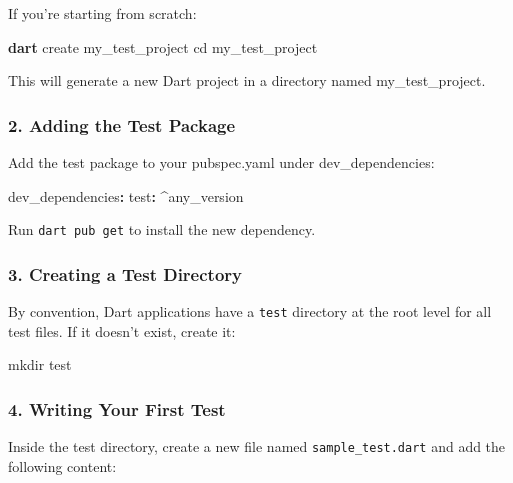\documentclass[
]{article}
\newenvironment{Shaded}{\begin{snugshade}}{\end{snugshade}}
\newcommand{\AttributeTok}[1]{\textcolor[rgb]{0.16,0.50,0.73}{#1}}
\newcommand{\BuiltInTok}[1]{\textcolor[rgb]{0.50,0.55,0.55}{#1}}
\newcommand{\ExtensionTok}[1]{\textcolor[rgb]{0.00,0.60,1.00}{\textbf{#1}}}
\newcommand{\FunctionTok}[1]{\textcolor[rgb]{0.56,0.27,0.68}{#1}}
\newcommand{\KeywordTok}[1]{\textcolor[rgb]{0.81,0.81,0.76}{\textbf{#1}}}
\newcommand{\NormalTok}[1]{\textcolor[rgb]{0.81,0.81,0.76}{#1}}
\begin{document}
If you're starting from scratch:

\begin{Shaded}
\begin{Highlighting}[]
\ExtensionTok{dart}\NormalTok{ create my\_test\_project}
\BuiltInTok{cd}\NormalTok{ my\_test\_project}
\end{Highlighting}
\end{Shaded}

This will generate a new Dart project in a directory named
my\_test\_project.

\subsubsection{2. Adding the Test
Package}\label{adding-the-test-package}

Add the test package to your pubspec.yaml under dev\_dependencies:

\begin{Shaded}
\begin{Highlighting}[]
\FunctionTok{dev\_dependencies}\KeywordTok{:}
\AttributeTok{  }\FunctionTok{test}\KeywordTok{:}\AttributeTok{ \^{}any\_version}
\end{Highlighting}
\end{Shaded}

Run \texttt{dart\ pub\ get} to install the new dependency.

\subsubsection{3. Creating a Test
Directory}\label{creating-a-test-directory}

By convention, Dart applications have a \texttt{test} directory at the
root level for all test files. If it doesn't exist, create it:

\begin{Shaded}
\begin{Highlighting}[]
\FunctionTok{mkdir}\NormalTok{ test}
\end{Highlighting}
\end{Shaded}

\subsubsection{4. Writing Your First
Test}\label{writing-your-first-test}

Inside the test directory, create a new file named
\texttt{sample\_test.dart} and add the following content:
\end{document}

